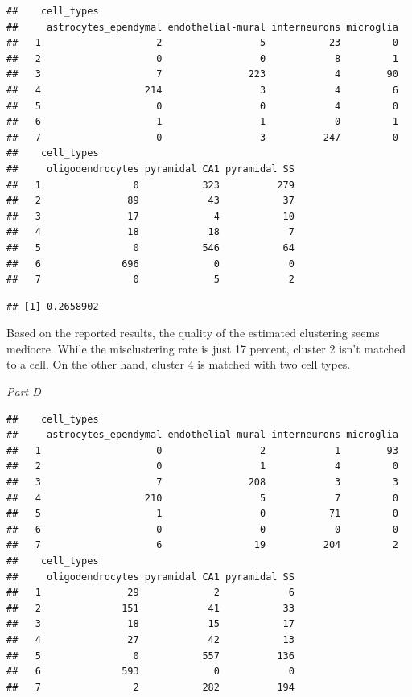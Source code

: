 \documentclass[]{article}
\newenvironment{Shaded}{\begin{snugshade}}{\end{snugshade}}
\newcommand{\KeywordTok}[1]{\textcolor[rgb]{0.13,0.29,0.53}{\textbf{#1}}}
\newcommand{\NormalTok}[1]{#1}
\newcommand{\OperatorTok}[1]{\textcolor[rgb]{0.81,0.36,0.00}{\textbf{#1}}}
\begin{document}
\begin{verbatim}
##    cell_types
##     astrocytes_ependymal endothelial-mural interneurons microglia
##   1                    2                 5           23         0
##   2                    0                 0            8         1
##   3                    7               223            4        90
##   4                  214                 3            4         6
##   5                    0                 0            4         0
##   6                    1                 1            0         1
##   7                    0                 3          247         0
##    cell_types
##     oligodendrocytes pyramidal CA1 pyramidal SS
##   1                0           323          279
##   2               89            43           37
##   3               17             4           10
##   4               18            18            7
##   5                0           546           64
##   6              696             0            0
##   7                0             5            2
\end{verbatim}

\begin{Shaded}
\end{Shaded}

\begin{verbatim}
## [1] 0.2658902
\end{verbatim}

Based on the reported results, the quality of the estimated clustering
seems mediocre. While the misclustering rate is just 17 percent, cluster
2 isn't matched to a cell. On the other hand, cluster 4 is matched with
two cell types.

\emph{Part D}

\begin{verbatim}
##    cell_types
##     astrocytes_ependymal endothelial-mural interneurons microglia
##   1                    0                 2            1        93
##   2                    0                 1            4         0
##   3                    7               208            3         3
##   4                  210                 5            7         0
##   5                    1                 0           71         0
##   6                    0                 0            0         0
##   7                    6                19          204         2
##    cell_types
##     oligodendrocytes pyramidal CA1 pyramidal SS
##   1               29             2            6
##   2              151            41           33
##   3               18            15           17
##   4               27            42           13
##   5                0           557          136
##   6              593             0            0
##   7                2           282          194
\end{verbatim}
\end{document}

